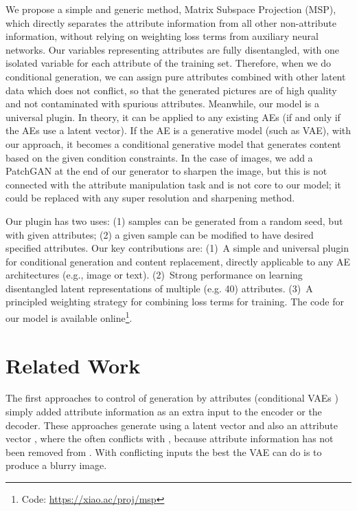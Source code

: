 \documentclass{article}
\begin{document}
We propose a simple and generic method, Matrix Subspace Projection (MSP), which directly separates the attribute information from all other non-attribute information, without relying on weighting loss terms from auxiliary neural networks. 
Our variables representing attributes  are fully disentangled, with one isolated variable for each attribute of the training set.
Therefore, when we do  conditional generation, we can assign  pure attributes combined with other latent data which does not conflict, so that the generated pictures are of high quality and not
contaminated with spurious attributes.
Meanwhile, our model is a universal plugin. In theory, it can be applied to any existing AEs (if and only if the AEs use a latent vector). If the AE is a generative model (such as VAE), with our approach, it becomes a conditional generative model that generates content based on the given condition constraints.
In the case of images, we add a PatchGAN at the end of our generator to sharpen the image, but this is not connected with the attribute manipulation task and is not core to our model; it could be replaced with any super resolution and sharpening method.



Our plugin has two uses: (1)   samples can be  generated from a random seed, but with given attributes; (2) a given sample can be modified to have desired  specified attributes. Our key contributions are:
(1)~A simple and universal plugin for conditional generation and content replacement, directly applicable to any AE architectures (e.g., image or text). (2)~Strong performance on learning disentangled latent representations of multiple (e.g. 40) attributes. (3)~A principled weighting strategy for combining loss terms for training. The code for our model is available online\footnote{Code: \url{https://xiao.ac/proj/msp}}.


\section{Related Work}\label{sec:relatedwork}



The first approaches to control of generation by attributes (conditional VAEs \cite{NIPS2014_5352,NIPS2015_5775,DBLP:conf/eccv/YanYSL16}) simply added attribute  information as an extra input to the encoder or the decoder. These approaches generate using a latent vector  and also an attribute vector , where the  often conflicts with , because attribute information has not been removed from .
With conflicting inputs the best the VAE can do is to produce a blurry image. 
\end{document}
